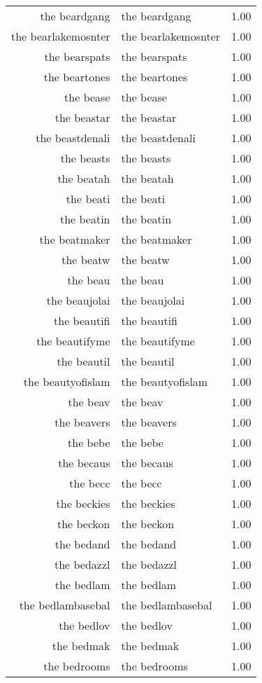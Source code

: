 \begin{table}[ht]
\begin{tabular}{rlr}
  the beardgang & the beardgang & 1.00 \\ 
  the bearlakemosnter & the bearlakemosnter & 1.00 \\ 
  the bearspats & the bearspats & 1.00 \\ 
  the beartones & the beartones & 1.00 \\ 
  the bease & the bease & 1.00 \\ 
  the beastar & the beastar & 1.00 \\ 
  the beastdenali & the beastdenali & 1.00 \\ 
  the beasts & the beasts & 1.00 \\ 
  the beatah & the beatah & 1.00 \\ 
  the beati & the beati & 1.00 \\ 
  the beatin & the beatin & 1.00 \\ 
  the beatmaker & the beatmaker & 1.00 \\ 
  the beatw & the beatw & 1.00 \\ 
  the beau & the beau & 1.00 \\ 
  the beaujolai & the beaujolai & 1.00 \\ 
  the beautifi & the beautifi & 1.00 \\ 
  the beautifyme & the beautifyme & 1.00 \\ 
  the beautil & the beautil & 1.00 \\ 
  the beautyofislam & the beautyofislam & 1.00 \\ 
  the beav & the beav & 1.00 \\ 
  the beavers & the beavers & 1.00 \\ 
  the bebe & the bebe & 1.00 \\ 
  the becaus & the becaus & 1.00 \\ 
  the becc & the becc & 1.00 \\ 
  the beckies & the beckies & 1.00 \\ 
  the beckon & the beckon & 1.00 \\ 
  the bedand & the bedand & 1.00 \\ 
  the bedazzl & the bedazzl & 1.00 \\ 
  the bedlam & the bedlam & 1.00 \\ 
  the bedlambasebal & the bedlambasebal & 1.00 \\ 
  the bedlov & the bedlov & 1.00 \\ 
  the bedmak & the bedmak & 1.00 \\ 
  the bedrooms & the bedrooms & 1.00 \\ 

\end{tabular}
\end{table}
